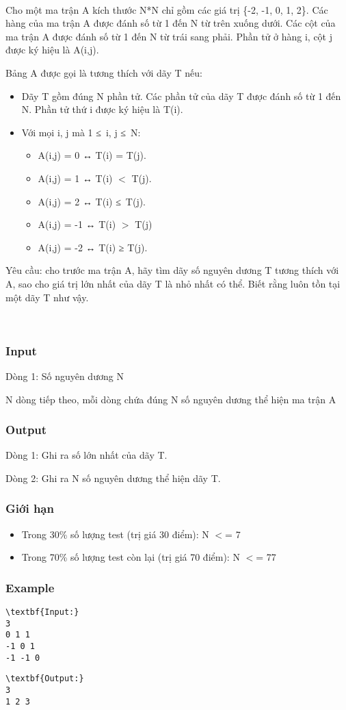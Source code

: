 

 

Cho một ma trận A kích thước N*N chỉ gồm các giá trị \{-2, -1, 0, 1, 2\}. Các hàng của ma trận A được đánh số từ 1 đến N từ trên xuống dưới. Các cột của ma trận A được đánh số từ 1 đến N từ trái sang phải. Phần tử ở hàng i, cột j được ký hiệu là A(i,j).

Bảng A được gọi là tương thích với dãy T nếu:
\begin{itemize}
	\item Dãy T gồm đúng N phần tử. Các phần tử của dãy T được đánh số từ 1 đến N. Phần tử thứ i được ký hiệu là T(i).
	\item Với mọi i, j mà 1 ≤ i, j ≤ N:
\begin{itemize}
	\item A(i,j) = 0 ↔ T(i) = T(j).
	\item A(i,j) = 1 ↔ T(i) $<$ T(j).
	\item A(i,j) = 2 ↔ T(i) ≤ T(j).
	\item A(i,j) = -1 ↔ T(i) $>$ T(j)
	\item A(i,j) = -2 ↔ T(i) ≥ T(j).
\end{itemize}
\end{itemize}

Yêu cầu: cho trước ma trận A, hãy tìm dãy số nguyên dương T tương thích với A, sao cho giá trị lớn nhất của dãy T là nhỏ nhất có thể. Biết rằng luôn tồn tại một dãy T như vậy.

 

\subsubsection{Input}

Dòng 1: Số nguyên dương N

N dòng tiếp theo, mỗi dòng chứa đúng N số nguyên dương thể hiện ma trận A

\subsubsection{Output}

Dòng 1: Ghi ra số lớn nhất của dãy T.

Dòng 2: Ghi ra N số nguyên dương thể hiện dãy T.

\subsubsection{Giới hạn}
\begin{itemize}
	\item Trong 30\% số lượng test (trị giá 30 điểm): N $<$= 7
	\item Trong 70\% số lượng test còn lại (trị giá 70 điểm): N $<$= 77
\end{itemize}

\subsubsection{Example}
\begin{verbatim}
\textbf{Input:}
3
0 1 1
-1 0 1
-1 -1 0\end{verbatim}
\begin{verbatim}
\textbf{Output:}
3
1 2 3\end{verbatim}